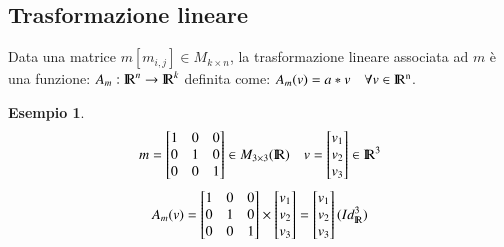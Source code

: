 \documentclass[12pt,a4paper]{article}
\theoremstyle{break}
\newtheorem{example}{Esempio}[subsection]
\newcommand\R{{\rm I\!R}}
\begin{document}
    \subsection{Trasformazione lineare}
    Data una matrice $m[m_{i,j}]\in M_{k\times n}$, la trasformazione lineare associata ad $m$ è una funzione:
    \(A_m: \R^n \rightarrow \R^k\) definita come: \(A_m(v)=a*v\quad \forall v\in {}\rm I\!R^n\).
    \begin{example}
        \[
            m = 
            \begin{bmatrix}
                1 & 0 & 0 \\
                0 & 1 & 0 \\
                0 & 0 & 1 \\
            \end{bmatrix}
            \in M_{3\times 3}(\R)
            \quad
            v = 
            \begin{bmatrix}
                v_1 \\
                v_2 \\
                v_3 \\
            \end{bmatrix}
            \in \R^3
        \]
        \[
            A_m(v)=
            \begin{bmatrix}
                1 & 0 & 0 \\
                0 & 1 & 0 \\
                0 & 0 & 1 \\
            \end{bmatrix}
            \times
            \begin{bmatrix}
                v_1 \\
                v_2 \\
                v_3 \\
            \end{bmatrix}
            =
            \begin{bmatrix}
                v_1 \\
                v_2 \\
                v_3 \\
            \end{bmatrix}
            (Id_\R^3)
        \]
    \end{example}
\end{document}
